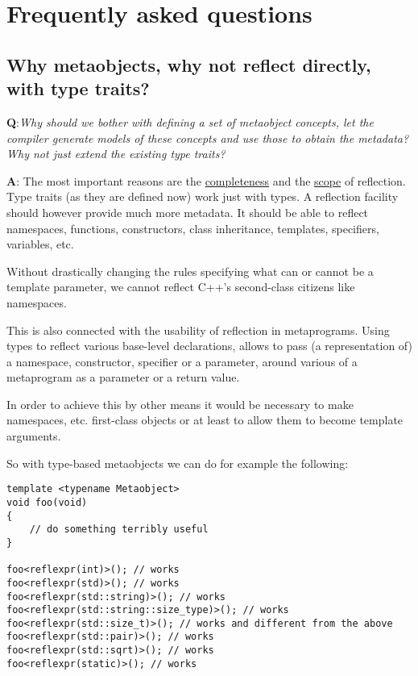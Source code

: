 \section{Frequently asked questions}

\subsection{Why metaobjects, why not reflect directly, with type traits?}
\label{faq-why-metaobjects}

{\textbf Q:}{\em Why should we bother with defining a set of metaobject concepts,
let the compiler generate models of these concepts and use those to obtain
the metadata? Why not just extend the existing type traits?}

{\textbf A:} The most important reasons are the \hyperref[design-completeness]{completeness}
and the \hyperref[design-scope]{scope} of reflection.
Type traits (as they are defined now) work just with types. A reflection facility should
however provide much more metadata.
It should be able to reflect namespaces, functions, constructors,
class inheritance, templates, specifiers, variables, etc.

Without drastically changing the rules specifying what can or cannot be a template
parameter, we cannot reflect C++'s second-class citizens like namespaces.

This is also connected with the usability of reflection in metaprograms.
Using types to reflect various base-level declarations, allows to
pass (a representation of) a namespace, constructor, specifier or a parameter,
around various  of a metaprogram as a parameter or a return value.

In order to achieve this by other means it would be necessary to make namespaces,
etc. first-class objects or at least to allow them to become template arguments.

So with type-based metaobjects we can do for example the following:

\begin{verbatim}
template <typename Metaobject>
void foo(void)
{
	// do something terribly useful
}

foo<reflexpr(int)>(); // works
foo<reflexpr(std)>(); // works
foo<reflexpr(std::string)>(); // works
foo<reflexpr(std::string::size_type)>(); // works
foo<reflexpr(std::size_t)>(); // works and different from the above
foo<reflexpr(std::pair)>(); // works
foo<reflexpr(std::sqrt)>(); // works
foo<reflexpr(static)>(); // works
\end{verbatim}

